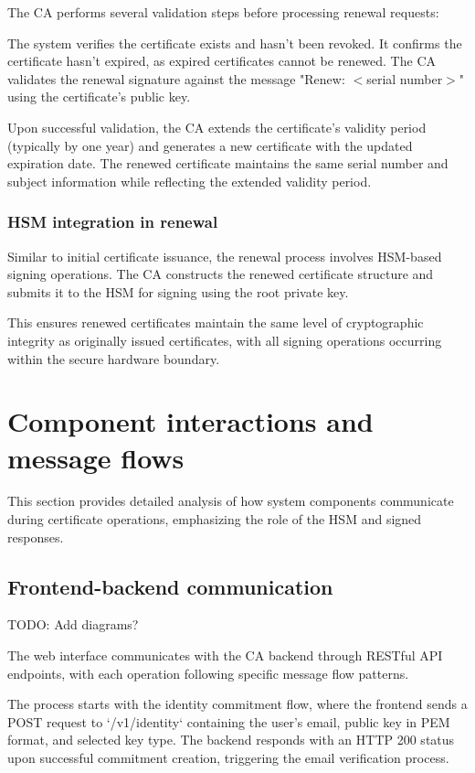 The CA performs several validation steps before processing renewal requests:

The system verifies the certificate exists and hasn't been revoked. It confirms 
the certificate hasn't expired, as expired certificates cannot be renewed. 
The CA validates the renewal signature against the message "Renew: $<$serial number$>$" 
using the certificate's public key.

Upon successful validation, the CA extends the certificate's validity period 
(typically by one year) and generates a new certificate with the updated expiration 
date. The renewed certificate maintains the same serial number and subject 
information while reflecting the extended validity period.

\subsubsection{HSM integration in renewal}

Similar to initial certificate issuance, the renewal process involves HSM-based 
signing operations. The CA constructs the renewed certificate structure and 
submits it to the HSM for signing using the root private key.

This ensures renewed certificates maintain the same level of cryptographic 
integrity as originally issued certificates, with all signing operations 
occurring within the secure hardware boundary.

\section{Component interactions and message flows}

This section provides detailed analysis of how system components communicate during 
certificate operations, emphasizing the role of the HSM and signed responses.

\subsection{Frontend-backend communication}
{\color{red}TODO: Add diagrams?}

The web interface communicates with the CA backend through RESTful API endpoints, 
with each operation following specific message flow patterns.

The process starts with the identity commitment flow, where the frontend sends a POST request to 
`/v1/identity` containing the user's email, public key in PEM format, and 
selected key type. The backend responds with an HTTP 200 status upon successful 
commitment creation, triggering the email verification process.

